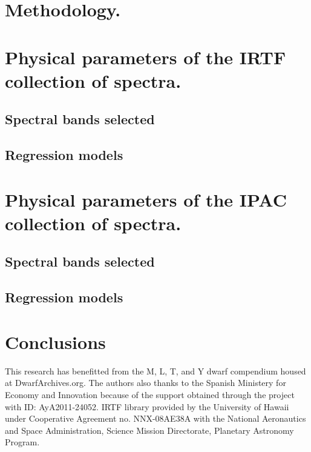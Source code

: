 \documentclass[referee]{aa}
\begin{document}




\section{Methodology. \label{meth}}


\section{Physical parameters of the IRTF collection of spectra.}
%
\subsection{Spectral bands selected}

\subsection{Regression models}


\section{Physical parameters of the IPAC collection of spectra.}
%
\subsection{Spectral bands selected}

\subsection{Regression models}
%

\section{Conclusions}

\begin{acknowledgements}
This research has benefitted from the M, L, T, and Y dwarf compendium housed at DwarfArchives.org.
The authors also thanks to the Spanish Ministery for Economy and Innovation because of the 
support obtained through the project with ID: AyA2011-24052. IRTF library provided by the 
University of Hawaii under Cooperative Agreement no. NNX-08AE38A with the National 
Aeronautics and Space Administration, Science Mission Directorate, Planetary Astronomy Program.
\end{acknowledgements}


{}

\end{document}
